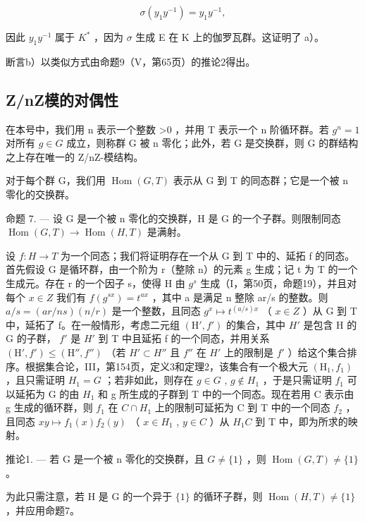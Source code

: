 \[
\sigma \left(y _ {1} y ^ {- 1}\right) = y _ {1} y ^ {- 1},
\]

因此 \(y_{1}y^{-1}\) 属于 \(K^{*}\) ，因为 \(\sigma\) 生成 E 在 K 上的伽罗瓦群。这证明了 a）。

断言b）以类似方式由命题9（V，第65页）的推论2得出。

\subsection{Z/nZ模的对偶性}

在本号中，我们用 n 表示一个整数 \textgreater0 ，并用 T 表示一个 n 阶循环群。若 \(g^{n}=1\) 对所有 \(g\in G\) 成立，则称群 G 被 n 零化；此外，若 G 是交换群，则 G 的群结构之上存在唯一的 Z/nZ-模结构。

对于每个群 G，我们用 \(\operatorname{Hom}(G, T)\) 表示从 G 到 T 的同态群；它是一个被 n 零化的交换群。

命题 7. --- 设 G 是一个被 n 零化的交换群，H 是 G 的一个子群。则限制同态 \(\operatorname{Hom}(G, T) \to \operatorname{Hom}(H, T)\) 是满射。

设 \(f:H\to T\) 为一个同态；我们将证明存在一个从 G 到 T 中的、延拓 f 的同态。首先假设 G 是循环群，由一个阶为 r（整除 n）的元素 g 生成；记 t 为 T 的一个生成元。存在 r 的一个因子 s，使得 H 由 \(g^{s}\) 生成（I，第50页，命题19），并且对每个 \(x \in Z\) 我们有 \(f(g^{sx}) = t^{ax}\) ，其中 a 是满足 n 整除 ar/s 的整数。则 \(a/s = (ar/ns)(n/r)\) 是一个整数，且同态 \(g^{x} \mapsto t^{(a/s)x}\) （ \(x \in Z\) ）从 G 到 T 中，延拓了 f。在一般情形，考虑二元组 \((\mathrm{H}', f')\) 的集合，其中 \(H'\) 是包含 H 的 G 的子群， \(f'\) 是 \(H'\) 到 T 中且延拓 f 的一个同态，并用关系 \((\mathrm{H}', f') \leqslant (\mathrm{H}'', f'')\) （若 \(H' \subset H''\) 且 \(f''\) 在 \(H'\) 上的限制是 \(f'\) ）给这个集合排序。根据集合论，III，第154页，定义3和定理2，该集合有一个极大元 \((\mathrm{H}_{1}, f_{1})\) ，且只需证明 \(H_{1} = G\) ；若非如此，则存在 \(g \in G\) , \(g \notin H_{1}\) ，于是只需证明 \(f_{1}\) 可以延拓为 G 的由 \(H_{1}\) 和 g 所生成的子群到 T 中的一个同态。现在若用 C 表示由 g 生成的循环群，则 \(f_{1}\) 在 \(C \cap H_{1}\) 上的限制可延拓为 C 到 T 中的一个同态 \(f_{2}\) ，且同态 \(xy \mapsto f_{1}(x) f_{2}(y)\) （ \(x \in H_{1}\) , \(y \in C\) ）从 \(H_{1}C\) 到 T 中，即为所求的映射。

推论1. --- 若 G 是一个被 n 零化的交换群，且 \(G \neq \{1\}\) ，则 \(\operatorname{Hom}(G, T) \neq \{1\}\) 。

为此只需注意，若 H 是 G 的一个异于 \(\{1\}\) 的循环子群，则 \(\operatorname{Hom}(H, T) \neq \{1\}\) ，并应用命题7。

